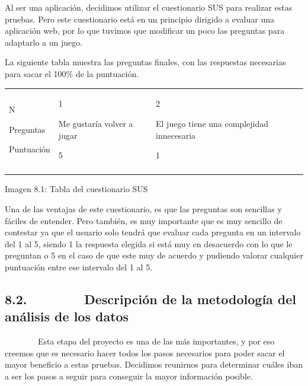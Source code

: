 \documentclass[]{article}
\begin{document}
Al ser una aplicación, decidimos utilizar el cuestionario SUS para
realizar estas pruebas. Pero este cuestionario está en un principio
dirigido a evaluar una aplicación web, por lo que tuvimos que modificar
un poco las preguntas para adaptarlo a un juego.

La siguiente tabla muestra las preguntas finales, con las respuestas
necesarias para sacar el 100\% de la puntuación.

\begin{longtable}[c]{@{}lll@{}}
\toprule\addlinespace
\begin{minipage}[t]{0.30\columnwidth}\raggedright
N

Preguntas

Puntuación
\end{minipage} & \begin{minipage}[t]{0.30\columnwidth}\raggedright
1

Me gustaría volver a jugar

5
\end{minipage} & \begin{minipage}[t]{0.30\columnwidth}\raggedright
2

El juego tiene una complejidad innecesaria

1
\end{minipage}
\\\addlinespace
\bottomrule
\end{longtable}

Imagen 8.1: Tabla del cuestionario SUS

Una de las ventajas de este cuestionario, es que las preguntas son
sencillas y fáciles de entender. Pero también, es muy importante que es
muy sencillo de contestar ya que el usuario solo tendrá que evaluar cada
pregunta en un intervalo del 1 al 5, siendo 1 la respuesta elegida si
está muy en desacuerdo con lo que le preguntan o 5 en el caso de que
este muy de acuerdo y pudiendo valorar cualquier puntuación entre ese
intervalo del 1 al 5.

\subsection{8.2.~~~~~~~~Descripción de la metodología del análisis de
los datos}\label{h.2muw05ic1bu9}

~~~~~~~~Esta etapa del proyecto es una de las más importantes, y por eso
creemos que es necesario hacer todos los pasos necesarios para poder
sacar el mayor beneficio a estas pruebas. Decidimos reunirnos para
determinar cuáles iban a ser los pasos a seguir para conseguir la mayor
información posible.
\end{document}
